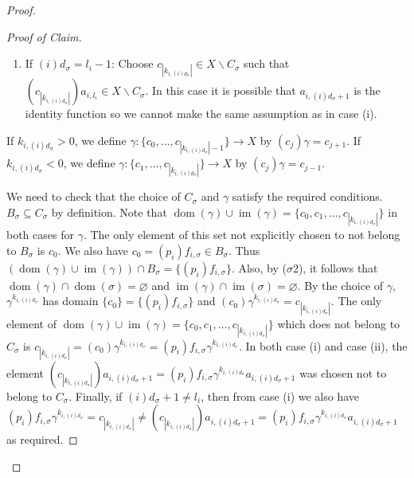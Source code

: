 \documentclass[10pt,a4paper]{amsart}
\newcommand{\dom}{\operatorname{dom}}
\newcommand{\im}{\operatorname{im}}
\begin{document}
\begin{proof}
\begin{proof}[Proof of Claim]
\begin{enumerate}
       \item[(ii)] If \((i)d_\sigma= l_i-1\): 
         Choose \(c_{|k_{i,(i)d_{\sigma}}|}\in X\backslash C_\sigma\) such that \((c_{|k_{i,(i)d_{\sigma}}|})a_{i,l_i}\in X\backslash C_\sigma\). In this case it is possible that \(a_{i,(i)d_{\sigma}+1}\) is the identity function so we cannot make the same assumption as in case (i).
     \end{enumerate}
     If \(k_{i,(i)d_{\sigma}}>0\), we define \(\gamma: \{c_0,\ldots, c_{|k_{i,(i)d_{\sigma}}|-1}\}\to X\) by \((c_j)\gamma=c_{j+1}\). If \(k_{i,(i)d_{\sigma}}<0\), we define  \(\gamma: \{c_1,\ldots, c_{|k_{i,(i)d_{\sigma}}|}\}\to X\) by \((c_j)\gamma=c_{j-1}\).   

     We need to check that the choice of \(C_\sigma\) and \(\gamma\) satisfy the required conditions. \(B_\sigma \subseteq C_\sigma\) by definition. Note that \(\dom(\gamma)\cup \im(\gamma)=\{c_0, c_1,\ldots, c_{|k_{i,(i)d_{\sigma}}|}\}\) in both cases for \(\gamma\). The only element of this set not explicitly chosen to not belong to \(B_\sigma\) is \(c_0\). We also have \(c_0=(p_i)f_{i,\sigma}\in B_\sigma\). Thus \((\dom(\gamma)\cup \im(\gamma))\cap B_{\sigma}=\{(p_i)f_{i,\sigma}\}\). Also, by ($\sigma$2), it follows that \(\dom(\gamma)\cap \dom(\sigma)=\varnothing\) and \(\im(\gamma)\cap \im(\sigma)=\varnothing\).
     By the choice of \(\gamma\), \(\gamma^{k_{i,(i)d_{\sigma}}}\) has domain \(\{c_0\}=\{(p_i)f_{i,\sigma}\}\) and \((c_0)\gamma^{k_{i,(i)d_{\sigma}}}=c_{|k_{i,(i)d_{\sigma}}|}\).
     The only element of \(\dom(\gamma)\cup \im(\gamma)=\{c_0, c_1,\ldots, c_{|k_{i,(i)d_{\sigma}}|}\}\) which does not belong to \(C_\sigma\) is \(c_{|k_{i,(i)d_{\sigma}}|}=(c_0)\gamma^{k_{i,(i)d_{\sigma}}}=(p_i)f_{i,\sigma}\gamma^{k_{i,(i)d_{\sigma}}}\).
     In both case (i) and case (ii), the element \((c_{|k_{i,(i)d_{\sigma}}|})a_{i, (i)d_{\sigma}+1}=(p_i)f_{i,\sigma}\gamma^{k_{i,(i)d_{\sigma}}}a_{i, (i)d_{\sigma}+1}\) was chosen not to belong to \(C_\sigma\). Finally, if \((i)d_{\sigma}+1\neq l_i\), then from case (i) we also have \((p_i)f_{i,\sigma}\gamma^{k_{i,(i)d_{\sigma}}}=c_{|k_{i,(i)d_{\sigma}}|}\neq (c_{|k_{i,(i)d_{\sigma}}|})a_{i, (i)d_{\sigma}+1}=(p_i)f_{i,\sigma}\gamma^{k_{i,(i)d_{\sigma}}}a_{i, (i)d_{\sigma}+1}\) as required.
     \end{proof}
     

\end{proof}
\end{document}
